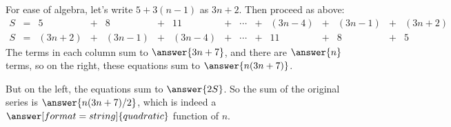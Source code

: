 \documentclass[nooutcomes]{ximera}
\begin{document}
\begin{problem}
\begin{problem}
\begin{problem}
\begin{problem}
For ease of algebra, let's write $5+3(n-1)$ as $3n+2$.  Then proceed as above:  
\[
\begin{array}{ccccccccccccccc}
S & = &     5  & + & 8      & + &  11    & + & \cdots & + & (3n-4) & + & (3n-1) & + & (3n+2) \\
S & = & (3n+2) & + & (3n-1) & + & (3n-4) & + & \cdots & + & 11     & + &    8   & + & 5
\end{array}
\]
The terms in each column sum to $\answer{3n+7}$, and there are $\answer{n}$ terms, so on the right, these equations sum to $\answer{n(3n+7)}$.  

But on the left, the equations sum to $\answer{2S}$.  So the sum of the original series is 
$\answer{n(3n+7)/2}$, which is indeed a $\answer[format=string]{quadratic}$ function of $n$.  
\end{problem}

\end{problem}


\end{problem}


\end{problem}
\end{document}
